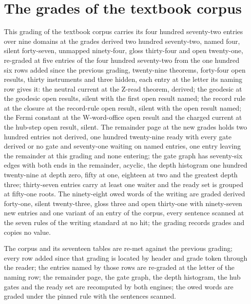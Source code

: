 \section{The grades of the textbook corpus}\label{mod:IV-10-D541267-internal-dictionary-release-fourteen}
\begin{chtable}
This grading of the textbook corpus carries its four hundred seventy-two entries over nine domains at the grades derived two hundred seventy-two, named four, silent forty-seven, unmapped ninety-four, gloss thirty-four and open twenty-one, re-graded at five entries of the four hundred seventy-two from the one hundred six rows added since the previous grading, twenty-nine theorems, forty-four open results, thirty instruments and three hidden, each entry at the letter its naming row gives it: the neutral current at the Z-read theorem, derived; the geodesic at the geodesic open results, silent with the first open result named; the record rule at the closure at the record-rule open result, silent with the open result named; the Fermi constant at the W-word-office open result and the charged current at the hub-step open result, silent. The remainder page at the new grades holds two hundred entries not derived, one hundred twenty-nine ready with every gate derived or no gate and seventy-one waiting on named entries, one entry leaving the remainder at this grading and none entering; the gate graph has seventy-six edges with both ends in the remainder, acyclic, the depth histogram one hundred twenty-nine at depth zero, fifty at one, eighteen at two and the greatest depth three; thirty-seven entries carry at least one waiter and the ready set is grouped at fifty-one roots. The ninety-eight owed words of the writing are graded derived forty-one, silent twenty-three, gloss three and open thirty-one with ninety-seven new entries and one variant of an entry of the corpus, every sentence scanned at the seven rules of the writing standard at no hit; the grading records grades and copies no value.
\end{chtable}
\chdeps{}{}
The corpus and its seventeen tables are re-met against the previous grading; every row added since that grading is located by header and grade token through the reader; the entries named by those rows are re-graded at the letter of the naming row; the remainder page, the gate graph, the depth histogram, the hub gates and the ready set are recomputed by both engines; the owed words are graded under the pinned rule with the sentences scanned.

